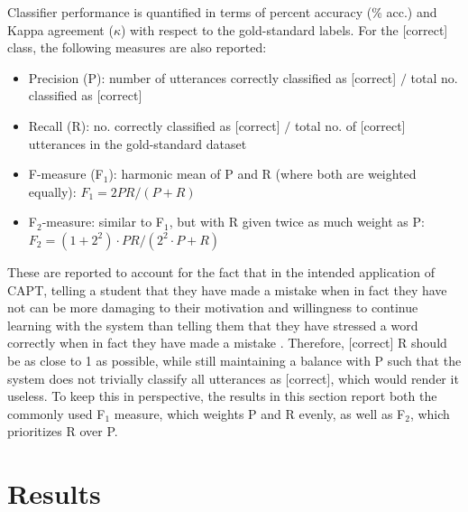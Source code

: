 \documentclass[a4paper]{article}
\begin{document}
		Classifier performance is quantified in terms of percent accuracy (\% acc.) and Kappa agreement ($\kappa$) with respect to the gold-standard labels. For the [correct] class, 
	the following measures are also reported:
	\begin{itemize}
			\item{Precision (P): number of utterances correctly classified as [correct] $/$ total no. classified as [correct]
			}
			\item{Recall (R): no. correctly classified as [correct] $/$ total no. of [correct] utterances in the gold-standard dataset
			}
			\item{F-measure (F$_1$):
			harmonic mean of P and R (where both are weighted equally): $F_1 = 2PR/(P+R)$
			}
			\item{F$_2$-measure: 
			similar to F$_1$, but with R given twice as much weight as P: $F_2 = (1+2^2) \cdot PR/(2^2 \cdot P+R)$ %
			}
	\end{itemize}
	These are reported to account for the fact that in the intended application of CAPT, telling a student that they have made a mistake when in fact they have not can be more damaging to their motivation and willingness to continue learning with the system than telling them that they have stressed a word correctly when in fact they have made a mistake \cite{Neri2002}. Therefore, [correct] R should be as close to 1 as possible, while still maintaining a balance with P such that the system does not trivially classify all utterances as [correct], which would render it useless. To keep this in perspective, the results in this section report both the commonly used F$_1$ measure, which weights P and R evenly, as well as F$_2$, which prioritizes R over P.
		

	\section{Results}
	\label{sec:results}
	
\end{document}

